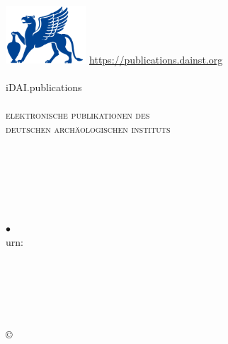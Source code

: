 \documentclass[fontsize=8pt,english,ngerman]{scrartcl}
\def\issnonlinetag{\issntagonline \mysep \eng{\issntagonline} \mybf{\issnonline}\\}
\begin{document}
\begin{flushright}
\includegraphics[width=3cm]{dailogo}\hspace*{1.9cm}%
{\tiny\href{https://publications.dainst.org}{https://publications.dainst.org}}\\[-.2em]
\myrule\\[.5em]
{\fontsize{30}{10}\selectfont iDAI.publications}\\
\myrule\\[.5em]
{\scshape elektronische publikationen des\\ deutschen archäologischen instituts}
\end{flushright}
\RaggedRight
\vspace*{4em}
\entry{\digitaloffprint}{}\\[1em]
{\huge\artauthor\\[.5em]
\mybf{\arttitle}}\vfill

\entry{\from}{}

{\huge\mybf{\journal}\\
\journalsubtitle\\[3em]}

\entry{\issuetag}{\issue} {$\bullet$} \mybf{\yearpub}\hfill\purl\\
\entry{\pagestag}{\pages}\hfill urn: \urn\\[1em]
\vfill
\begin{footnotesize}
\entry{\editortag}{\editor}\\
\entry{\journalurltag}{\journalurl}\\
\entry{\issntag}{\issn}\\
\issnonlinetag
\entry{\publishertag}{\publisher}\\[1em]

\copyright\,\the\year{} \copyrightdai\\[1em]
\terms\\[1em]
\eng{\terms}\\
\end{footnotesize}
\end{document}
